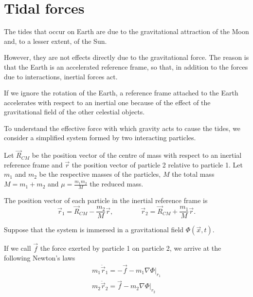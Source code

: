 \section{Tidal forces}

\begin{points}
\item The tides that occur on Earth are due to the gravitational attraction of the Moon and, to a lesser extent, of the Sun.

\item However, they are not effects directly due to the gravitational force. The reason is that the Earth is an accelerated reference frame, so that, in addition to the forces due to interactions, inertial forces act.

\item If we ignore the rotation of the Earth, a reference frame attached to the Earth accelerates with respect to an inertial one because of the effect of the gravitational field of the other celestial objects.

\item To understand the effective force with which gravity acts to cause the tides, we consider a simplified system formed by two interacting particles.

\item Let $\vec R_{CM}$ be the position vector of the centre of mass with respect to an inertial reference frame and $\vec r$ the position vector of particle 2 relative to particle 1. Let $m_1$ and $m_2$ be the respective masses of the particles, $M$ the total mass $M=m_1+m_2$ and $\mu=\frac{m_1m_2}{M}$ the reduced mass.

\item The position vector of each particle in the inertial reference frame is
\[
  \vec r_1=\vec R_{CM}-\frac{m_2}{M}\vec r,\qquad\qquad\vec r_2=\vec R_{CM}+\frac{m_1}{M}\vec r .
\]

\item Suppose that the system is immersed in a gravitational field $\Phi(\vec x,t)$.

\item If we call $\vec f$ the force exerted by particle 1 on particle 2, we arrive at the following Newton's laws
\begin{gather*}
  m_1\ddot{\vec r}_1=-\vec f-m_1\left.\nabla\Phi\right|_{r_1}\\
  m_2\ddot{\vec r}_2=\vec f-m_2\left.\nabla\Phi\right|_{r_2}
\end{gather*}


\end{points}
